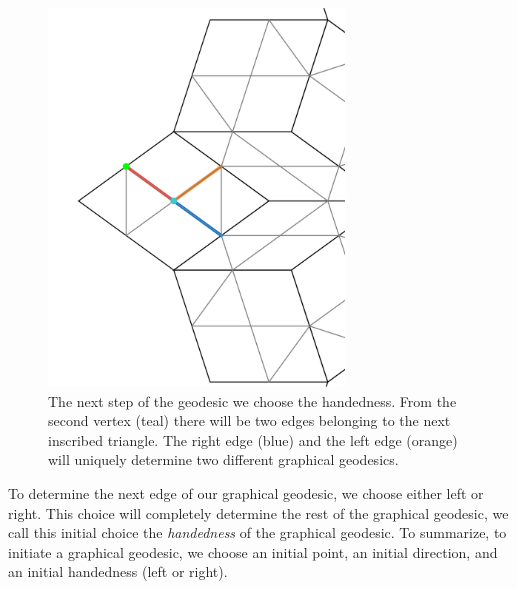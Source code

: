 \documentclass[
  oneside,
  11pt, a4paper,
  footinclude=true,
  headinclude=true,
  cleardoublepage=empty
]{scrbook}
\begin{document}
\begin{figure}[H]
\centering
\includegraphics[width=0.7\textwidth]{NextStep}
\caption[Next Step of Geodesic]{The next step of the geodesic we choose the handedness. From the second vertex (teal) there will be two edges belonging to the next inscribed triangle. The right edge (blue) and the left edge (orange) will uniquely determine two different graphical geodesics.}
\label{fig:nextstep}
\end{figure}
To determine the next edge of our graphical geodesic, we choose either left or right. This choice will completely determine the rest of the graphical geodesic, we call this initial choice the \textit{handedness} of the graphical geodesic. To summarize, to initiate a graphical geodesic, we choose an initial point, an initial direction, and an initial handedness (left or right).
\end{document}
